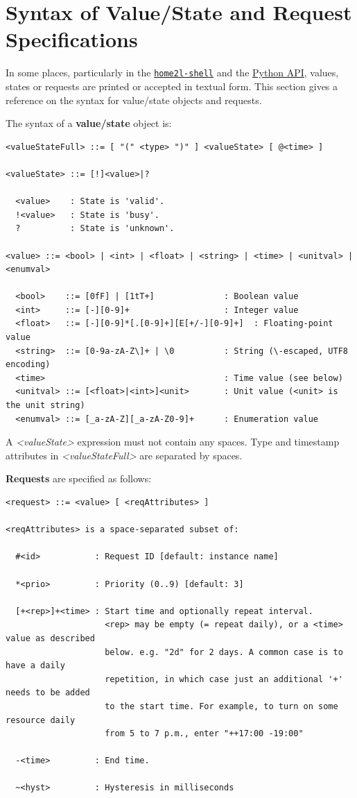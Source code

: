 \documentclass[12pt,english,parskip=half,headheight=19pt]{scrreprt}
\newcommand{\idx}[1]{#1\index{#1}}
\newcommand{\reftool}[1]{\hyperref[tool:#1]{\texttt{\idx{#1}}}}
\newcommand{\refdoc}[2]{\href{#1}{#2}}              %
\newcommand{\theapipython}{\refdoc{home2l-api_python/index.html}{Python API}}
\begin{document}
\section{Syntax of Value/State and Request Specifications}
\label{sec:resources-syntax}


In some places, particularly in the \reftool{home2l-shell} and the \theapipython{}, values, states or requests are printed or accepted in textual form. This section gives a reference on the syntax for value/state objects and requests.

The syntax of a \textbf{value/state} object is:
\begin{lstlisting}
<valueStateFull> ::= [ "(" <type> ")" ] <valueState> [ @<time> ]

<valueState> ::= [!]<value>|?

  <value>    : State is 'valid'.
  !<value>   : State is 'busy'.
  ?          : State is 'unknown'.

<value> ::= <bool> | <int> | <float> | <string> | <time> | <unitval> | <enumval>

  <bool>    ::= [0fF] | [1tT+]              : Boolean value
  <int>     ::= [-][0-9]+                   : Integer value
  <float>   ::= [-][0-9]*[.[0-9]+][E[+/-][0-9]+]  : Floating-point value
  <string>  ::= [0-9a-zA-Z\]+ | \0          : String (\-escaped, UTF8 encoding)
  <time>                                    : Time value (see below)
  <unitval> ::= [<float>|<int>]<unit>       : Unit value (<unit> is the unit string)
  <enumval> ::= [_a-zA-Z][_a-zA-Z0-9]+      : Enumeration value

\end{lstlisting}

A \textit{<valueState>} expression must not contain any spaces. Type and timestamp attributes in \textit{<valueStateFull>} are separated by spaces.



\textbf{Requests} are specified as follows:
\begin{lstlisting}
<request> ::= <value> [ <reqAttributes> ]

<reqAttributes> is a space-separated subset of:

  #<id>           : Request ID [default: instance name]

  *<prio>         : Priority (0..9) [default: 3]

  [+<rep>]+<time> : Start time and optionally repeat interval.
                    <rep> may be empty (= repeat daily), or a <time> value as described
                    below. e.g. "2d" for 2 days. A common case is to have a daily
                    repetition, in which case just an additional '+' needs to be added
                    to the start time. For example, to turn on some resource daily
                    from 5 to 7 p.m., enter "++17:00 -19:00"

  -<time>         : End time.

  ~<hyst>         : Hysteresis in milliseconds
\end{lstlisting}
\end{document}
